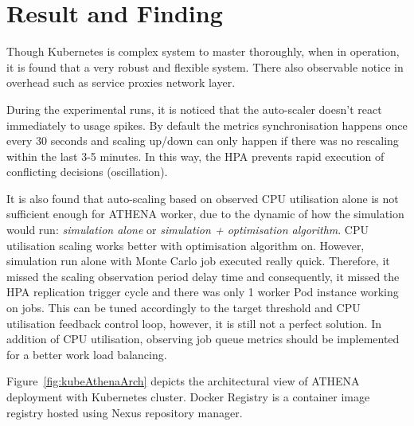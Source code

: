 
\newpage

\section{Result and Finding}

Though Kubernetes is complex system to master thoroughly, when in operation, it is found that a very robust and flexible system. There also observable notice in overhead such as service proxies network layer. 

During the experimental runs, it is noticed that the auto-scaler doesn't react immediately to usage spikes. By default the metrics synchronisation happens once every 30 seconds and scaling up/down can only happen if there was no rescaling within the last 3-5 minutes. In this way, the HPA prevents rapid execution of conflicting decisions (oscillation). 

It is also found that auto-scaling based on observed CPU utilisation alone is not sufficient enough for ATHENA worker, due to the dynamic of how the simulation would run: \emph{simulation alone} or \emph{simulation + optimisation algorithm}. CPU utilisation scaling works better with optimisation algorithm on. However, simulation run alone with Monte Carlo job executed really quick. Therefore, it missed the scaling observation period delay time and consequently, it missed the HPA replication trigger cycle and there was only 1 worker Pod instance working on jobs. This can be tuned accordingly to the target threshold and CPU utilisation feedback control loop, however, it is still not a perfect solution. In addition of CPU utilisation, observing job queue metrics should be implemented for a better work load balancing.

Figure~\ref{fig:kubeAthenaArch} depicts the architectural view of ATHENA deployment with Kubernetes cluster. Docker Registry is a container image registry hosted using Nexus repository manager.

